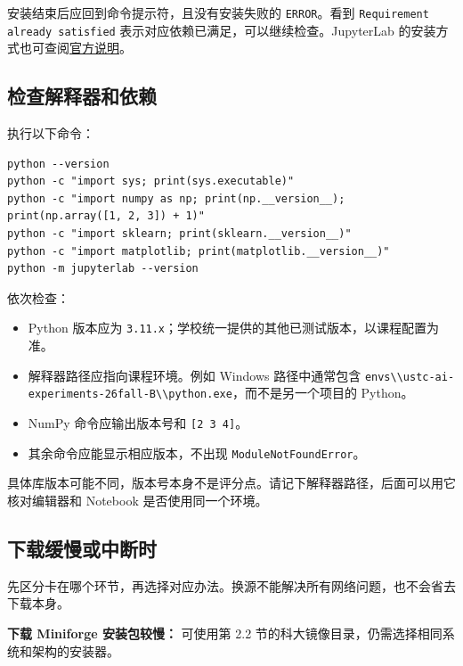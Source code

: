 \documentclass[UTF8,a4paper,11pt,fontset=fandol]{ctexart}
\providecommand{\tightlist}{\setlength{\itemsep}{0pt}\setlength{\parskip}{0pt}}
\providecommand{\passthrough}[1]{#1}
\begin{document}
安装结束后应回到命令提示符，且没有安装失败的 \passthrough{\lstinline!ERROR!}。看到 \passthrough{\lstinline!Requirement already satisfied!} 表示对应依赖已满足，可以继续检查。JupyterLab 的安装方式也可查阅\href{https://jupyterlab.readthedocs.io/en/stable/getting_started/installation.html}{官方说明}。

\subsection{检查解释器和依赖}\label{ux68c0ux67e5ux89e3ux91caux5668ux548cux4f9dux8d56}

执行以下命令：

\begin{lstlisting}[language={}]
python --version
python -c "import sys; print(sys.executable)"
python -c "import numpy as np; print(np.__version__); print(np.array([1, 2, 3]) + 1)"
python -c "import sklearn; print(sklearn.__version__)"
python -c "import matplotlib; print(matplotlib.__version__)"
python -m jupyterlab --version
\end{lstlisting}

依次检查：

\begin{itemize}
\tightlist
\item
  Python 版本应为 \passthrough{\lstinline!3.11.x!}；学校统一提供的其他已测试版本，以课程配置为准。
\item
  解释器路径应指向课程环境。例如 Windows 路径中通常包含 \passthrough{\lstinline!envs\\ustc-ai-experiments-26fall-B\\python.exe!}，而不是另一个项目的 Python。
\item
  NumPy 命令应输出版本号和 \passthrough{\lstinline![2 3 4]!}。
\item
  其余命令应能显示相应版本，不出现 \passthrough{\lstinline!ModuleNotFoundError!}。
\end{itemize}

具体库版本可能不同，版本号本身不是评分点。请记下解释器路径，后面可以用它核对编辑器和 Notebook 是否使用同一个环境。

\subsection{下载缓慢或中断时}\label{ux4e0bux8f7dux7f13ux6162ux6216ux4e2dux65adux65f6}

先区分卡在哪个环节，再选择对应办法。换源不能解决所有网络问题，也不会省去下载本身。

\textbf{下载 Miniforge 安装包较慢：} 可使用第 2.2 节的科大镜像目录，仍需选择相同系统和架构的安装器。
\end{document}
